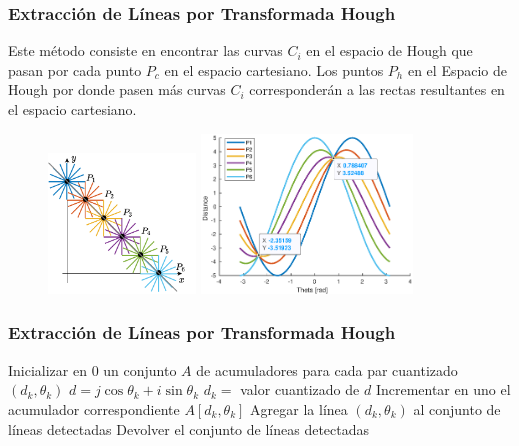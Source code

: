 \begin{frame}\frametitle{Extracción de Líneas por Transformada Hough}
  Este método consiste en encontrar las curvas $C_i$ en el espacio de Hough que pasan por cada punto $P_c$ en el espacio cartesiano. Los puntos $P_h$ en el Espacio de Hough por donde pasen más curvas $C_i$ corresponderán a las rectas resultantes en el espacio cartesiano.
  \begin{figure}
    \centering
    \includegraphics[width=0.35\textwidth]{Figuras/Hough1.pdf}
    \includegraphics[width=0.5\textwidth]{Figuras/Hough1.eps}
  \end{figure}
\end{frame}

\begin{frame}\frametitle{Extracción de Líneas por Transformada Hough}
  \begin{algorithm}[H]
    \DontPrintSemicolon
    \;
    Inicializar en 0 un conjunto $A$ de acumuladores para cada par cuantizado $(d_k,\theta_k)$\;
    {
      {
        $d = j\cos\theta_k + i\sin\theta_k$
        $d_k = $ valor cuantizado de $d$
        Incrementar en uno el acumulador correspondiente $A[d_k, \theta_k]$
      }
    }
    {
      {
        Agregar la línea $(d_k, \theta_k)$ al conjunto de líneas detectadas
      }
    }
    Devolver el conjunto de líneas detectadas
  \end{algorithm}
\end{frame}

